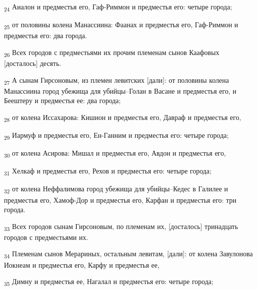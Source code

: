 \begin{tcolorbox}
\textsubscript{24} Аиалон и предместья его, Гаф-Риммон и предместья его: четыре города;
\end{tcolorbox}
\begin{tcolorbox}
\textsubscript{25} от половины колена Манассиина: Фаанах и предместья его, Гаф-Риммон и предместья его: два города.
\end{tcolorbox}
\begin{tcolorbox}
\textsubscript{26} Всех городов с предместьями их прочим племенам сынов Каафовых [досталось] десять.
\end{tcolorbox}
\begin{tcolorbox}
\textsubscript{27} А сынам Гирсоновым, из племен левитских [дали]: от половины колена Манассиина город убежища для убийцы--Голан в Васане и предместья его, и Беештеру и предместья ее: два города;
\end{tcolorbox}
\begin{tcolorbox}
\textsubscript{28} от колена Иссахарова: Кишион и предместья его, Давраф и предместья его,
\end{tcolorbox}
\begin{tcolorbox}
\textsubscript{29} Иармуф и предместья его, Ен-Ганним и предместья его: четыре города;
\end{tcolorbox}
\begin{tcolorbox}
\textsubscript{30} от колена Асирова: Мишал и предместья его, Авдон и предместья его,
\end{tcolorbox}
\begin{tcolorbox}
\textsubscript{31} Хелкаф и предместья его, Рехов и предместья его: четыре города;
\end{tcolorbox}
\begin{tcolorbox}
\textsubscript{32} от колена Неффалимова город убежища для убийцы--Кедес в Галилее и предместья его, Хамоф-Дор и предместья его, Карфан и предместья его: три города.
\end{tcolorbox}
\begin{tcolorbox}
\textsubscript{33} Всех городов сынам Гирсоновым, по племенам их, [досталось] тринадцать городов с предместьями их.
\end{tcolorbox}
\begin{tcolorbox}
\textsubscript{34} Племенам сынов Мерариных, остальным левитам, [дали]: от колена Завулонова Иокнеам и предместья его, Карфу и предместья ее,
\end{tcolorbox}
\begin{tcolorbox}
\textsubscript{35} Димну и предместья ее, Нагалал и предместья его: четыре города;
\end{tcolorbox}
